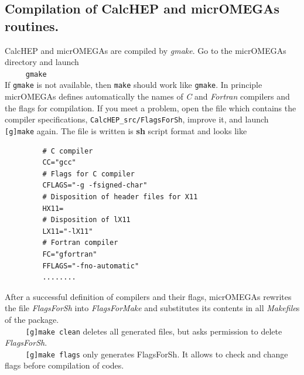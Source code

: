 \documentclass[12pt,a4paper]{article}
\begin{document}
\subsection{Compilation of CalcHEP and micrOMEGAs routines.}
   CalcHEP and micrOMEGAs are compiled by {\it gmake}. Go to the micrOMEGAs directory
and launch\\
\verb|     gmake|\\
If {\tt gmake} is not available, then {\tt make} should work like {\tt gmake}.
In principle  micrOMEGAs  defines automatically the names of {\it C} and {\it
Fortran} compilers and the flags for
compilation. If you meet a  problem, open the file which contains the compiler specifications, 
\verb|CalcHEP_src/FlagsForSh|,
 improve it, and launch {\tt [g]make} 
again. The file  is written is {\bf sh} script format and looks like
\begin{verbatim}
         # C compiler
         CC="gcc"
         # Flags for C compiler
         CFLAGS="-g -fsigned-char"
         # Disposition of header files for X11
         HX11=
         # Disposition of lX11
         LX11="-lX11"
         # Fortran compiler
         FC="gfortran"
         FFLAGS="-fno-automatic"
         ........
\end{verbatim}
After a successful definition of compilers and their flags,   micrOMEGAs rewrites the file 
 {\it FlagsForSh} into {\it FlagsForMake} and substitutes its contents in all {\it
Makefile}s of the package.\\
\verb|     [g]make clean|    deletes all generated files, but asks permission to
delete {\it FlagsForSh}.\\
\verb|     [g]make flags|       only generates FlagsForSh. It allows to check and
change  flags before compilation of codes.


\end{document}
